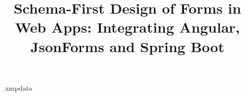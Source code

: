 \documentclass{utils/BachelorBUI}
\title{Schema-First Design of Forms in Web Apps: Integrating Angular, JsonForms and Spring Boot}
\begin{document}

    \begin{filecontents}[overwrite]{\jobname.xmpdata}
        \makeatletter
        \Title{\@title}
        \Author{\@authorname}
        \Language{\@thesislanguage}
        \Keywords{\@keywords}
        \makeatother
    \end{filecontents}

    \maketitle







    

    \tableofcontents
    
    

    

    

    \printbibliography
\end{document}
